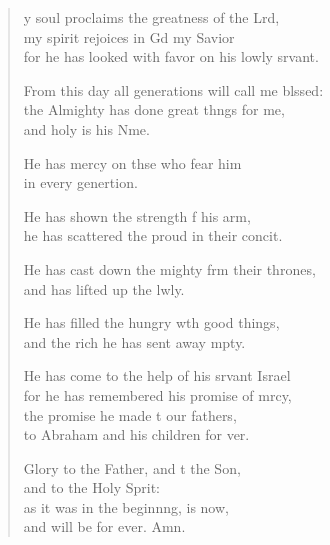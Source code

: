 \begin{verse}
  \begin{patverse}
y soul proclaims the greatness of the Lrd,\Flex\\
my spirit rejoices in Gd my Savior\Med\\
for he has looked with favor on his lowly srvant.

From this day all generations will call me blssed:\Flex\\
the Almighty has done great th\pointup{\i}ngs for me,\Med\\
and holy is his Nme.

He has mercy on thse who fear him\Med\\
in every genertion.

He has shown the strength f his arm,\Med\\
he has scattered the proud in their concit.

He has cast down the mighty frm their thrones,\Med\\
and has lifted up the lwly.

He has filled the hungry w\pointup{\i}th good things,\Med\\
and the rich he has sent away mpty.

He has come to the help of his srvant Israel\Med\\
for he has remembered his promise of mrcy,\\
the promise he made t our fathers,\Med\\
to Abraham and his children for ver.

Glory to the Father, and t the Son,\Med\\
and to the Holy Sp\pointup{\i}rit:\\
as it was in the beginn\pointup{\i}ng, is now,\Med\\
and will be for ever. Amn.
  \end{patverse}
\end{verse}
